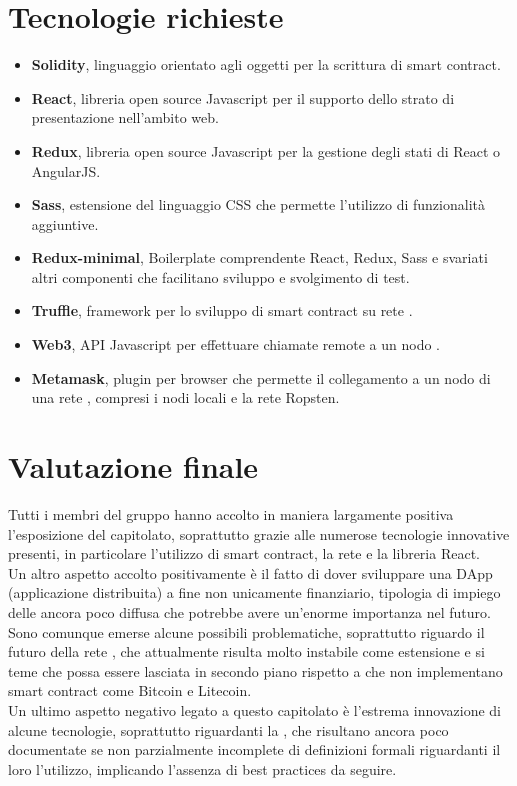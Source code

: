 \documentclass[StudioDiFattibilità.tex]{subfiles}
\begin{document}
\section{Tecnologie richieste}
\begin{itemize}
	\item \textbf{Solidity}, linguaggio orientato agli oggetti per la scrittura di smart contract.
	\item \textbf{React}, libreria open source Javascript per il supporto dello strato di presentazione nell'ambito web.
	\item \textbf{Redux}, libreria open source Javascript per la gestione degli stati di React o AngularJS.
	\item \textbf{Sass}, estensione del linguaggio CSS che permette l'utilizzo di funzionalità aggiuntive.
	\item \textbf{Redux-minimal}, Boilerplate comprendente React, Redux, Sass e svariati altri componenti che facilitano sviluppo e svolgimento di test.
	\item \textbf{Truffle}, framework per lo sviluppo di smart contract su rete .
	\item \textbf{Web3}, API Javascript per effettuare chiamate remote a un nodo .
	\item \textbf{Metamask}, plugin per browser che permette il collegamento a un nodo di una rete , compresi i nodi locali e la rete Ropsten.
\end{itemize}
\section{Valutazione finale}
Tutti i membri del gruppo hanno accolto in maniera largamente positiva l'esposizione del capitolato, soprattutto grazie alle numerose tecnologie innovative presenti, in particolare l'utilizzo di smart contract, la rete  e la libreria React.\\
Un altro aspetto accolto positivamente è il fatto di dover sviluppare una DApp (applicazione distribuita) a fine non unicamente finanziario, tipologia di impiego delle  ancora poco diffusa che potrebbe avere un'enorme importanza nel futuro.\\
Sono comunque emerse alcune possibili problematiche, soprattutto riguardo il futuro della rete , che attualmente risulta molto instabile come estensione e si teme che possa essere lasciata in secondo piano rispetto a  che non implementano smart contract come Bitcoin e Litecoin.\\
Un ultimo aspetto negativo legato a questo capitolato è l'estrema innovazione di alcune tecnologie, soprattutto riguardanti la , che risultano ancora poco documentate se non parzialmente incomplete di definizioni formali riguardanti il loro l'utilizzo, implicando l'assenza di best practices da seguire.
\end{document}
